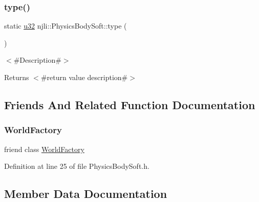 \subsubsection{\texorpdfstring{type()}{type()}}
{\footnotesize\ttfamily static \mbox{\hyperlink{_util_8h_a10e94b422ef0c20dcdec20d31a1f5049}{u32}} njli\+::\+Physics\+Body\+Soft\+::type (\begin{DoxyParamCaption}{ }\end{DoxyParamCaption})\hspace{0.3cm}{\ttfamily [static]}}

$<$\#\+Description\#$>$

\begin{DoxyReturn}{Returns}
$<$\#return value description\#$>$ 
\end{DoxyReturn}


\subsection{Friends And Related Function Documentation}
\mbox{\label{classnjli_1_1_physics_body_soft_acb96ebb09abe8f2a37a915a842babfac}} 
\subsubsection{\texorpdfstring{World\+Factory}{WorldFactory}}
{\footnotesize\ttfamily friend class \mbox{\hyperlink{classnjli_1_1_world_factory}{World\+Factory}}\hspace{0.3cm}{\ttfamily [friend]}}



Definition at line 25 of file Physics\+Body\+Soft.\+h.



\subsection{Member Data Documentation}
\mbox{\label{classnjli_1_1_physics_body_soft_a5cc839e65a947ce67d81141aceffff53}} 

